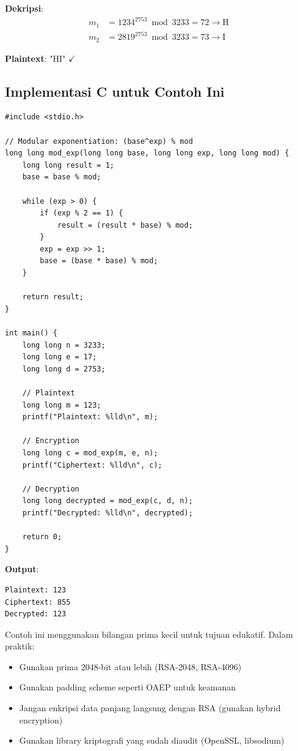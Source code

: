 \textbf{Dekripsi}:
\begin{align*}
m_1 &= 1234^{2753} \bmod 3233 = 72 \rightarrow \text{H} \\
m_2 &= 2819^{2753} \bmod 3233 = 73 \rightarrow \text{I}
\end{align*}

\textbf{Plaintext}: "HI" $\checkmark$

\subsection{Implementasi C untuk Contoh Ini}

\begin{lstlisting}[style=cstyle, caption={RSA dengan Parameter Kecil}]
#include <stdio.h>

// Modular exponentiation: (base^exp) % mod
long long mod_exp(long long base, long long exp, long long mod) {
    long long result = 1;
    base = base % mod;
    
    while (exp > 0) {
        if (exp % 2 == 1) {
            result = (result * base) % mod;
        }
        exp = exp >> 1;
        base = (base * base) % mod;
    }
    
    return result;
}

int main() {
    long long n = 3233;
    long long e = 17;
    long long d = 2753;
    
    // Plaintext
    long long m = 123;
    printf("Plaintext: %lld\n", m);
    
    // Encryption
    long long c = mod_exp(m, e, n);
    printf("Ciphertext: %lld\n", c);
    
    // Decryption
    long long decrypted = mod_exp(c, d, n);
    printf("Decrypted: %lld\n", decrypted);
    
    return 0;
}
\end{lstlisting}

\textbf{Output}:
\begin{verbatim}
Plaintext: 123
Ciphertext: 855
Decrypted: 123
\end{verbatim}

\begin{catatan}
Contoh ini menggunakan bilangan prima kecil untuk tujuan edukatif. Dalam praktik:
\begin{itemize}
  \item Gunakan prima 2048-bit atau lebih (RSA-2048, RSA-4096)
  \item Gunakan padding scheme seperti OAEP untuk keamanan
  \item Jangan enkripsi data panjang langsung dengan RSA (gunakan hybrid encryption)
  \item Gunakan library kriptografi yang sudah diaudit (OpenSSL, libsodium)
\end{itemize}
\end{catatan}

